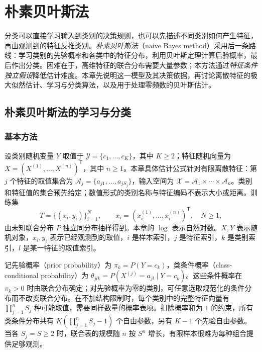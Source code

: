 \setcounter{chapter}{3} %
\chapter{朴素贝叶斯法}
\label{chap:lihang-naive-bayes}


分类可以直接学习输入到类别的决策规则，也可以先描述不同类别如何产生特征，再由观测到的特征反推类别。\emph{朴素贝叶斯法}（naive Bayes method）采用后一条路线：学习类别的先验概率和各类中的特征分布，利用贝叶斯定理计算后验概率，最后作出分类。困难在于，高维特征的联合分布需要大量参数；本方法通过\emph{特征条件独立假设}降低估计难度。本章先说明这一模型及其决策依据，再讨论离散特征的极大似然估计、学习与分类算法，以及用于处理零频数的贝叶斯估计。

\section{朴素贝叶斯法的学习与分类}
\label{sec:lihang-nb-learning-classification}

\subsection{基本方法}
\label{subsec:lihang-nb-basic-method}

设类别随机变量 $Y$ 取值于 $\mathcal{Y}=\{c_1,\ldots,c_K\}$，其中 $K\geq2$；特征随机向量为 $X=(X^{(1)},\ldots,X^{(n)})^{\mathsf T}$，其中 $n\geq1$。本章具体估计公式针对有限离散特征：第 $j$ 个特征的取值集合为 $\mathcal{A}_j=\{a_{j1},\ldots,a_{jS_j}\}$，输入空间为 $\mathcal{X}=\mathcal{A}_1\times\cdots\times\mathcal{A}_n$。类别和特征值的集合预先给定；数值形式的类别名称与特征编码不表示大小或距离。训练集
\[
    T=\{(x_i,y_i)\}_{i=1}^{N},\qquad
    x_i=(x_i^{(1)},\ldots,x_i^{(n)})^{\mathsf T},\quad N\geq1,
\]
由未知联合分布 $P$ 独立同分布抽样得到。本章的 $\log$ 表示自然对数。$X,Y$ 表示随机对象，$x_i,y_i$ 表示已经观测到的取值，$i$ 是样本索引，$j$ 是特征索引，$k$ 是类别索引，$l$ 是某一特征的取值索引。

记先验概率（prior probability）为 $\pi_k=P(Y=c_k)$，类条件概率（class-conditional probability）为 $\theta_{jlk}=P(X^{(j)}=a_{jl}\mid Y=c_k)$。这些条件概率在 $\pi_k>0$ 时由联合分布确定；对先验概率为零的类别，可任意选取规范化的条件分布而不改变联合分布。在不加结构限制时，每个类别中的完整特征向量有 $\prod_{j=1}^{n}S_j$ 种可能取值，需要同样数量的概率表项。扣除概率和为 $1$ 的约束，所有类条件分布共有 $K(\prod_{j=1}^{n}S_j-1)$ 个自由参数，另有 $K-1$ 个先验自由参数。当各 $S_j=S\geq2$ 时，联合表的规模随 $n$ 按 $S^n$ 增长，有限样本很难为每种组合提供足够观测。

